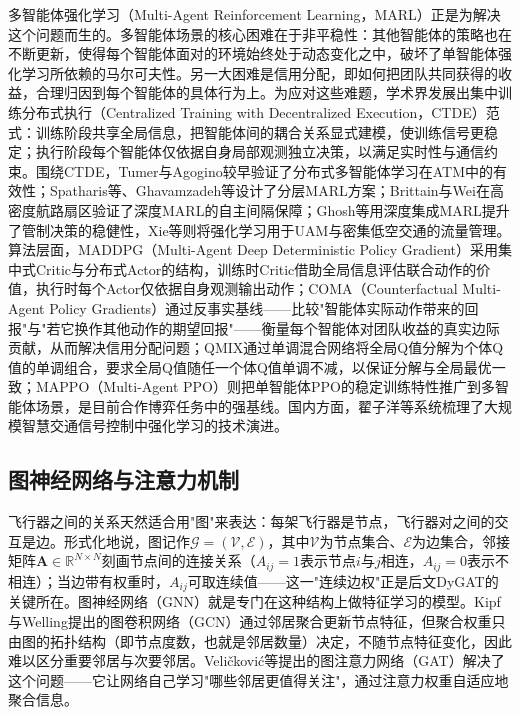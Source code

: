 \documentclass[12pt,a4paper,UTF8]{ctexart}
\begin{document}
多智能体强化学习（Multi-Agent Reinforcement Learning，MARL）正是为解决这个问题而生的。多智能体场景的核心困难在于非平稳性：其他智能体的策略也在不断更新，使得每个智能体面对的环境始终处于动态变化之中，破坏了单智能体强化学习所依赖的马尔可夫性。另一大困难是信用分配，即如何把团队共同获得的收益，合理归因到每个智能体的具体行为上。为应对这些难题，学术界发展出集中训练分布式执行（Centralized Training with Decentralized Execution，CTDE）范式：训练阶段共享全局信息，把智能体间的耦合关系显式建模，使训练信号更稳定；执行阶段每个智能体仅依据自身局部观测独立决策，以满足实时性与通信约束。围绕CTDE，Tumer与Agogino\cite{ref6,ref7,ref14,ref24}较早验证了分布式多智能体学习在ATM中的有效性；Spatharis等\cite{ref11}、Ghavamzadeh等\cite{ref23}设计了分层MARL方案；Brittain与Wei\cite{ref8}在高密度航路扇区验证了深度MARL的自主间隔保障；Ghosh等\cite{ref9}用深度集成MARL提升了管制决策的稳健性，Xie等\cite{ref29}则将强化学习用于UAM与密集低空交通的流量管理。算法层面，MADDPG（Multi-Agent Deep Deterministic Policy Gradient）\cite{ref34}采用集中式Critic与分布式Actor的结构，训练时Critic借助全局信息评估联合动作的价值，执行时每个Actor仅依据自身观测输出动作；COMA（Counterfactual Multi-Agent Policy Gradients）\cite{ref35}通过反事实基线——比较"智能体实际动作带来的回报"与"若它换作其他动作的期望回报"——衡量每个智能体对团队收益的真实边际贡献，从而解决信用分配问题；QMIX\cite{ref33}通过单调混合网络将全局Q值分解为个体Q值的单调组合，要求全局Q值随任一个体Q值单调不减，以保证分解与全局最优一致；MAPPO（Multi-Agent PPO）\cite{ref36}则把单智能体PPO的稳定训练特性推广到多智能体场景，是目前合作博弈任务中的强基线。国内方面，翟子洋等\cite{ref13}系统梳理了大规模智慧交通信号控制中强化学习的技术演进。

\subsection{图神经网络与注意力机制}

飞行器之间的关系天然适合用"图"来表达：每架飞行器是节点，飞行器对之间的交互是边。形式化地说，图记作$\mathcal{G}=(\mathcal{V},\mathcal{E})$，其中$\mathcal{V}$为节点集合、$\mathcal{E}$为边集合，邻接矩阵$\bm{A}\in\mathbb{R}^{N\times N}$刻画节点间的连接关系（$A_{ij}=1$表示节点$i$与$j$相连，$A_{ij}=0$表示不相连）；当边带有权重时，$A_{ij}$可取连续值——这一"连续边权"正是后文DyGAT的关键所在。图神经网络（GNN）就是专门在这种结构上做特征学习的模型。Kipf与Welling\cite{ref32}提出的图卷积网络（GCN）通过邻居聚合更新节点特征，但聚合权重只由图的拓扑结构（即节点度数，也就是邻居数量）决定，不随节点特征变化，因此难以区分重要邻居与次要邻居。Veličković等\cite{ref31}提出的图注意力网络（GAT）解决了这个问题——它让网络自己学习"哪些邻居更值得关注"，通过注意力权重自适应地聚合信息。
\end{document}
